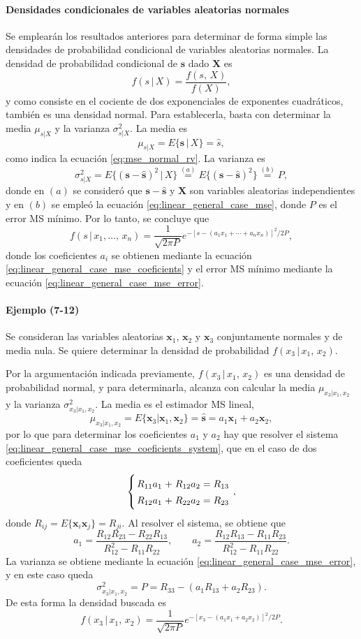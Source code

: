 \documentclass[a4paper]{report}
\newcommand{\X}{\mathbf{X}}
\newcommand{\x}{\mathbf{x}}
\newcommand{\s}{\mathbf{s}}
\begin{document}
\paragraph{Densidades condicionales de variables aleatorias normales} Se emplearán los resultados anteriores para determinar de forma simple las densidades de probabilidad condicional de variables aleatorias normales. La densidad de probabilidad condicional de \(\s\) dado \(\X\) es 
\[
 f(s\,|\,X)=\frac{f(s,\,X)}{f(X)},
\]
y como consiste en el cociente de dos exponenciales de exponentes cuadráticos, también es una densidad normal. Para establecerla, basta con determinar la media \(\mu_{s|X}\) y la varianza \(\sigma^2_{s|X}\). La media es
\[
 \mu_{s|X}=E\{\s\,|\,X\}=\hat{s},
\]
como indica la ecuación \ref{eq:mse_normal_rv}. La varianza es
\[
 \sigma^2_{s|X}=E\{(\s-\hat{\s})^2\,|\,X\}\overset{(a)}{=}E\{(\s-\hat{\s})^2\}\overset{(b)}{=}P,
\]
donde en \((a)\) se consideró que \(\s-\hat{\s}\) y \(\X\) son variables aleatorias independientes y en \((b)\) se empleó la ecuación \ref{eq:linear_general_case_mse}, donde \(P\) es el error MS mínimo. Por lo tanto, se concluye que
\[
 f(s\,|\,x_1,\dots,\,x_n)=\frac{1}{\sqrt{2\pi P}}e^{-[s-(a_1x_1+\cdots+a_nx_n)]^2/2P},
\]
donde los coeficientes \(a_i\) se obtienen mediante la ecuación \ref{eq:linear_general_case_mse_coeficients} y el error MS mínimo mediante la ecuación \ref{eq:linear_general_case_mse_error}.

\paragraph{Ejemplo (7-12)} Se consideran las variables aleatorias \(\x_1\), \(\x_2\) y \(\x_3\) conjuntamente normales y de media nula. Se quiere determinar la densidad de probabilidad \(f(x_3\,|\,x_1,\,x_2)\).

Por la argumentación indicada previamente, \(f(x_3\,|\,x_1,\,x_2)\) es una densidad de probabilidad normal, y para determinarla, alcanza con calcular la media \(\mu_{x_3|x_1,x_2}\) y la varianza \(\sigma^2_{x_3|x_1,x_2}\). La media es el estimador MS lineal,
\[
 \mu_{x_3|x_1,x_2}=E\{\x_3|\x_1,\x_2\}=\hat{\s}=a_1\x_1+a_2\x_2,
\]
por lo que para determinar los coeficientes \(a_1\) y \(a_2\) hay que resolver el sistema \ref{eq:linear_general_case_mse_coeficients_system}, que en el caso de dos coeficientes queda
\[
 \arraycolsep=1.4pt\def\arraystretch{1.4}
 \left\{\begin{array}{ccccc}
   R_{11}a_1&+&R_{12}a_2&=&R_{13}\\
   R_{12}a_1&+&R_{22}a_2&=&R_{23}
 \end{array}\right.,
\]
donde \(R_{ij}=E\{\x_{i}\x_{j}\}=R_{ji}\). Al resolver el sistema, se obtiene que
\[
 a_1=\frac{R_{12}R_{23}-R_{22}R_{13}}{R_{12}^2-R_{11}R_{22}},\qquad
 a_2=\frac{R_{12}R_{13}-R_{11}R_{23}}{R_{12}^2-R_{11}R_{22}}.
\]
La varianza se obtiene mediante la ecuación \ref{eq:linear_general_case_mse_error}, y en este caso queda
\[
 \sigma^2_{x_3|x_1,x_2}=P=R_{33}-({a_1R_{13}+a_2R_{23}}).
\]
De esta forma la densidad buscada es
\[
 f(x_3\,|\,x_1,\,x_2)=\frac{1}{\sqrt{2\pi P}}e^{-[x_3-(a_1x_1+a_2x_2)]^2/2P}.
\]
\end{document}
